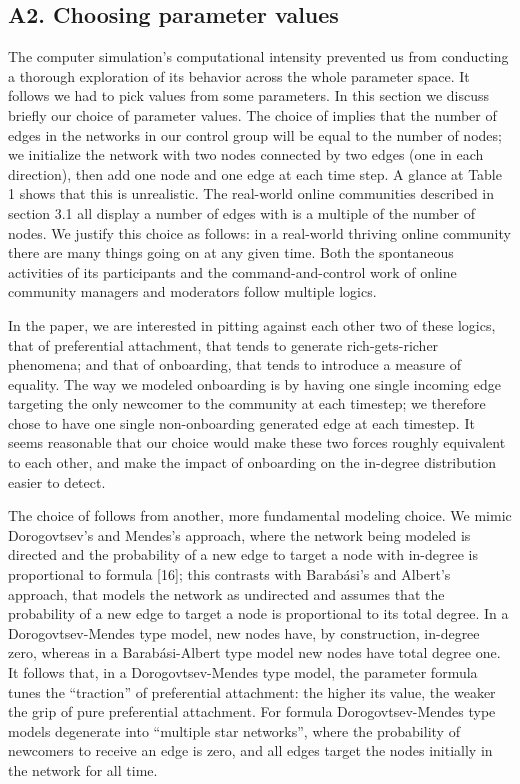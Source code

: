 \subsection*{A2. Choosing parameter values}

The computer simulation's computational intensity prevented us from conducting a thorough exploration of its behavior across the whole parameter space. It follows we had to pick values from some parameters. In this section we discuss briefly our choice of parameter values.
The choice of  implies that the number of edges in the networks in our control group will be equal to the number of nodes; we initialize the network with two nodes connected by two edges (one in each direction), then add one node and one edge at each time step. A glance at  Table 1 shows that this is unrealistic. The real-world online communities described in section 3.1 all display a number of edges with is a multiple of the number of nodes. We justify this choice as follows: in a real-world thriving online community there are many things going on at any given time. Both the spontaneous activities of its participants and the command-and-control work of online community managers and moderators follow multiple logics. 
 
In the paper, we are interested in pitting against each other two of these logics, that of preferential attachment, that tends to generate rich-gets-richer phenomena; and that of onboarding, that tends to introduce a measure of equality. The way we modeled onboarding is by having one single incoming edge targeting the only newcomer to the community at each timestep; we therefore chose to have one single non-onboarding generated edge at each timestep. It seems reasonable that our choice would make  these two forces roughly equivalent to each other, and make the impact of onboarding on the in-degree distribution easier to detect.

The choice of follows from another, more fundamental modeling choice. We mimic Dorogovtsev's and Mendes's approach, where the network being modeled is directed and the probability of a new edge to target a node with in-degree  is proportional to formula [16]; this contrasts with Barabási's and Albert's approach, that models the network as undirected and assumes that the probability of a new edge to target a node is proportional to its total degree. In a Dorogovtsev-Mendes type model, new nodes have, by construction, in-degree zero, whereas in a Barabási-Albert type model new nodes have total degree one. It follows that, in a Dorogovtsev-Mendes type model, the parameter formula tunes the “traction” of preferential attachment: the higher its value, the weaker the grip of pure preferential attachment. For formula Dorogovtsev-Mendes type models degenerate into “multiple star networks”, where the probability of newcomers to receive an edge is zero, and all edges target the nodes initially in the network for all time. 

